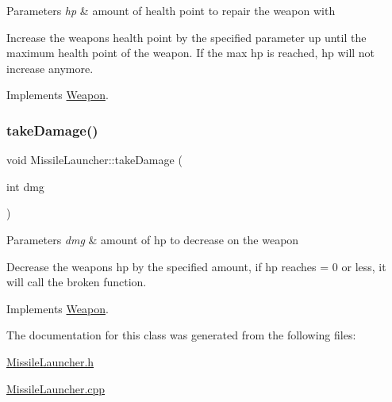 \begin{DoxyParams}{Parameters}
{\em hp} & amount of health point to repair the weapon with\\
\hline
\end{DoxyParams}
Increase the weapons health point by the specified parameter up until the maximum health point of the weapon. If the max hp is reached, hp will not increase anymore. 

Implements \hyperlink{classWeapon}{Weapon}.

\mbox{\label{classMissileLauncher_adc8ac71046e1a09962799897187e7759}} 
\subsubsection{\texorpdfstring{take\+Damage()}{takeDamage()}}
{\footnotesize\ttfamily void Missile\+Launcher\+::take\+Damage (\begin{DoxyParamCaption}\item[{int}]{dmg }\end{DoxyParamCaption})\hspace{0.3cm}{\ttfamily [virtual]}}


\begin{DoxyParams}{Parameters}
{\em dmg} & amount of hp to decrease on the weapon\\
\hline
\end{DoxyParams}
Decrease the weapons hp by the specified amount, if hp reaches = 0 or less, it will call the broken function. 

Implements \hyperlink{classWeapon}{Weapon}.



The documentation for this class was generated from the following files\+:\begin{DoxyCompactItemize}
\item 
\hyperlink{MissileLauncher_8h}{Missile\+Launcher.\+h}\item 
\hyperlink{MissileLauncher_8cpp}{Missile\+Launcher.\+cpp}\end{DoxyCompactItemize}
